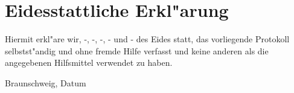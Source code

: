 \chapter*{Eidesstattliche Erkl"arung}\label{s:eid_erkl}


Hiermit erkl"are wir, -, -, -, - und - des Eides statt, das vorliegende Protokoll selbstst"andig und ohne
fremde Hilfe verfasst und keine anderen als die angegebenen Hilfsmittel verwendet zu
haben.

\vspace*{3cm}
Braunschweig, Datum
